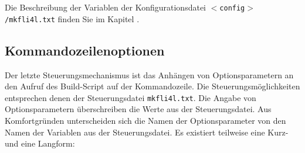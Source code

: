   Die Beschreibung der Variablen der Konfigurationsdatei
  \texttt{$<$config$>$/mkfli4l.txt} finden Sie im Kapitel
  .

  \subsection{Kommandozeilenoptionen}
  Der letzte Steuerungsmechanismus ist das Anhängen von Optionsparametern an
  den Aufruf des Build-Script auf der Kommandozeile. Die
  Steuerungsmöglichkeiten entsprechen denen der Steuerungsdatei \texttt{mkfli4l.txt}. 
  Die Angabe von Optionsparametern überschreiben die Werte aus
  der Steuerungsdatei. Aus Komfortgründen unterscheiden sich die Namen der
  Optionsparameter von den Namen der Variablen aus der Steuerungsdatei. Es
  existiert teilweise eine Kurz- und eine Langform:

